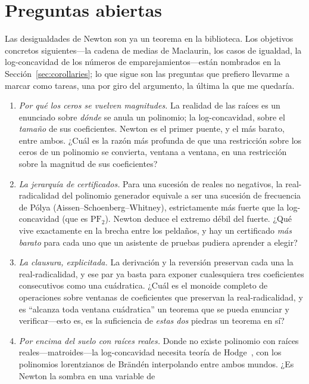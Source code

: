 \documentclass[11pt]{article}
\begin{document}
\section{Preguntas abiertas}\label{sec:questions}

Las desigualdades de Newton son ya un teorema en la biblioteca. Los objetivos concretos
siguientes---la cadena de medias de Maclaurin, los casos de igualdad, la log-concavidad de los
n\'umeros de emparejamientos---est\'an nombrados en la Secci\'on~\ref{sec:corollaries}; lo que sigue
son las preguntas que prefiero llevarme a marcar como tareas, una por giro del argumento, la \'ultima
la que me quedar\'ia.

\begin{enumerate}
\item \emph{Por qu\'e los ceros se vuelven magnitudes.} La realidad de las ra\'ices es un enunciado
sobre \emph{d\'onde} se anula un polinomio; la log-concavidad, sobre el \emph{tama\~no} de sus
coeficientes. Newton es el primer puente, y el m\'as barato, entre ambos. ¿Cu\'al es la raz\'on m\'as
profunda de que una restricci\'on sobre los ceros de un polinomio se convierta, ventana a ventana, en
una restricci\'on sobre la magnitud de sus coeficientes?
\item \emph{La jerarqu\'ia de certificados.} Para una sucesi\'on de reales no negativos, la
real-radicalidad del polinomio generador equivale a ser una sucesi\'on de frecuencia de P\'olya
(Aissen--Schoenberg--Whitney), estrictamente m\'as fuerte que la log-concavidad (que es
$\mathrm{PF}_2$). Newton deduce el extremo d\'ebil del fuerte. ¿Qu\'e vive exactamente en la brecha
entre los pelda\~nos, y hay un certificado \emph{m\'as barato} para cada uno que un asistente de
pruebas pudiera aprender a elegir?
\item \emph{La clausura, explicitada.} La derivaci\'on y la reversi\'on preservan cada una la
real-radicalidad, y ese par ya basta para exponer cualesquiera tres coeficientes consecutivos como
una cu\'adratica. ¿Cu\'al es el monoide completo de operaciones sobre ventanas de coeficientes que
preservan la real-radicalidad, y es ``alcanza toda ventana cu\'adratica'' un teorema que se pueda
enunciar y verificar---esto es, es la suficiencia de \emph{estas dos} piedras un teorema en s\'i?
\item \emph{Por encima del suelo con ra\'ices reales.} Donde no existe polinomio con ra\'ices
reales---matroides---la log-concavidad necesita teor\'ia de Hodge~\cite{AHK2018}, con los polinomios
lorentzianos de Br\"and\'en interpolando entre ambos mundos. ¿Es Newton la sombra en una variable de

\end{enumerate}
\end{document}
